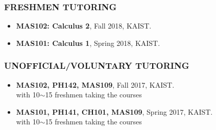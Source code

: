 \documentclass[10pt,a4]{article}
\begin{document}
\begin{small}
\subsubsection*{FRESHMEN TUTORING}
\begin{itemize}

\item {\bf MAS102: Calculus 2}, Fall 2018, KAIST.

\item {\bf MAS101: Calculus 1}, Spring 2018, KAIST.

\end{itemize}

\subsubsection*{UNOFFICIAL/VOLUNTARY TUTORING}
\begin{itemize}

\item {\bf MAS102, PH142, MAS109}, Fall 2017, KAIST. \\
with 10$\sim$15 freshmen taking the courses

\item {\bf MAS101, PH141, CH101, MAS109}, Spring 2017, KAIST. \\
with 10$\sim$15 freshmen taking the courses


\end{itemize}








\end{small}
\end{document}
